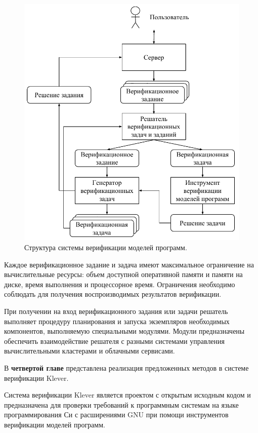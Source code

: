 \documentclass[%
autoref,
colorlinks,  
facsimile,   %
]{disser}
\begin{document}
\begin{figure}
\centering
\includegraphics[scale=0.7]{system}
\caption{Структура системы верификации моделей программ.}
\label{figure:system}
\end{figure}

Каждое верификационное задание и задача имеют максимальное ограничение на вычислительные ресурсы: объем доступной оперативной памяти и памяти на диске, время выполнения и процессорное время.
Ограничения необходимо соблюдать для получения воспроизводимых результатов верификации.

При получении на вход верификационного задания или задачи решатель выполняет процедуру планирования и запуска экземпляров необходимых компонентов, выполняемую специальными модулями.
Модули предназначены обеспечить взаимодействие решателя с разными системами управления вычислительными кластерами и облачными сервисами.

В \textbf{четвертой главе} представлена реализация предложенных методов в системе верификации Klever.

Система верификации Klever является проектом с открытым исходным кодом и предназначена для проверки требований к программным системам на языке программирования Си с расширениями GNU при помощи инструментов верификации моделей программ.
\end{document}
